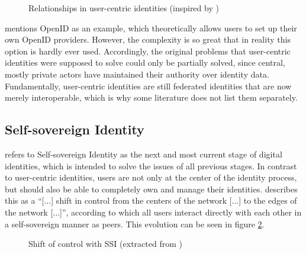 	    \begin{figure}[ht]
    	    \centering
    	    \makebox[\textwidth]{}
            \caption[Relationships in user-centric identities]{Relationships in user-centric identities (inspired by \cite{preukschat_self-sovereign_2021})}
            \label{figure: usercentric}
        \end{figure}
	    
	    \cite{allen_path_2016} mentions OpenID as an example, which theoretically allows users to set up their own OpenID providers. However, the complexity is so great that in reality this option is hardly ever used. Accordingly, the original problems that user-centric identities were supposed to solve could only be partially solved, since central, mostly private actors have maintained their authority over identity data. Fundamentally, user-centric identities are still federated identities that are now merely interoperable, which is why some literature \cite{ehrlich_self-sovereign_2021, preukschat_self-sovereign_2021} does not list them separately. \cite{allen_path_2016} 
	    
	    \subsection{Self-sovereign Identity}\label{subsection: stage ssi}
	    \cite{allen_path_2016} refers to Self-sovereign Identity as the next and most current stage of digital identities, which is intended to solve the issues of all previous stages. In contrast to user-centric identities, users are not only at the center of the identity process, but should also be able to completely own and manage their identities. \cite[p. 12]{preukschat_self-sovereign_2021} describes this as a “[...] shift in control from the centers of the network [...] to the edges of the network [...]”, according to which all users interact directly with each other in a self-sovereign manner as peers. This evolution can be seen in figure \ref{figure: shift}. 
	    
	    \begin{figure}[ht]
    	    \centering
    	    \makebox[\textwidth]{}
            \caption[Shift of control with \acs{SSI}]{Shift of control with \acs{SSI} (extracted from \cite[p. 12]{preukschat_self-sovereign_2021})}
            \label{figure: shift}
        \end{figure}
        
